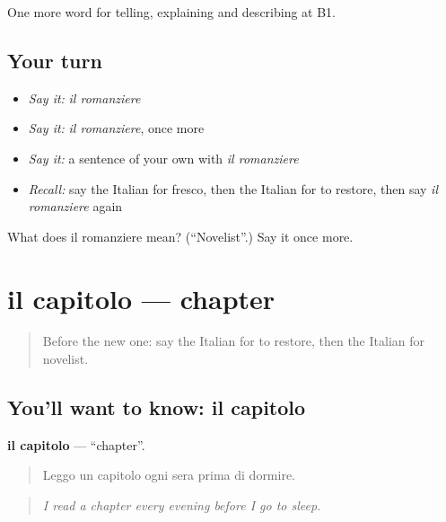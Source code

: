 \begin{grammarlens}[title={What you've built}]
One more word for telling, explaining and describing at B1.
\end{grammarlens}

\subsection*{Your turn}
\begin{itemize}
\raggedright
  \item \emph{Say it:} \emph{il romanziere}
  \item \emph{Say it:} \emph{il romanziere}, once more
  \item \emph{Say it:} a sentence of your own with \emph{il romanziere}
  \item \emph{Recall:} say the Italian for fresco, then the Italian for to restore, then say \emph{il romanziere} again
\end{itemize}

\begin{tcolorbox}[breakable,colback=teal!4,colframe=teal!35!black,title={Before you move on}]
What does il romanziere mean? (\textquotedblleft{}Novelist\textquotedblright{}.) Say it once more.
\end{tcolorbox}
\section[il capitolo]{il capitolo — chapter}

\label{lesson:IT-C524-capitolo}



\begin{quote}
Before the new one: say the Italian for to restore, then the Italian for novelist.
\end{quote}

\subsection*{You'll want to know: il capitolo}
\textbf{il capitolo} — \textquotedblleft{}chapter\textquotedblright{}.

\begin{quote}
Leggo un capitolo ogni sera prima di dormire.
\end{quote}

\begin{quote}
\emph{I read a chapter every evening before I go to sleep.}
\end{quote}

